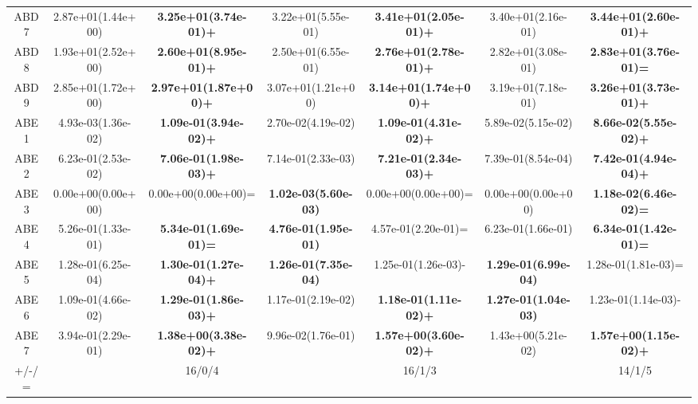 \begin{table}
\begin{tabular}{ccc|cc|cc}
  ABD7	&	2.87e+01(1.44e+00)	&	\textbf{3.25e+01(3.74e-01)+ }	&	3.22e+01(5.55e-01)	&	\textbf{3.41e+01(2.05e-01)+ }	&	3.40e+01(2.16e-01)	&	\textbf{3.44e+01(2.60e-01)+ }	\\
  ABD8	&	1.93e+01(2.52e+00)	&	\textbf{2.60e+01(8.95e-01)+ }	&	2.50e+01(6.55e-01)	&	\textbf{2.76e+01(2.78e-01)+ }	&	2.82e+01(3.08e-01)	&	\textbf{2.83e+01(3.76e-01)= }	\\
  ABD9	&	2.85e+01(1.72e+00)	&	\textbf{2.97e+01(1.87e+00)+ }	&	3.07e+01(1.21e+00)	&	\textbf{3.14e+01(1.74e+00)+ }	&	3.19e+01(7.18e-01)	&	\textbf{3.26e+01(3.73e-01)+ }	\\
  ABE1	&	4.93e-03(1.36e-02)	&	\textbf{1.09e-01(3.94e-02)+ }	&	2.70e-02(4.19e-02)	&	\textbf{1.09e-01(4.31e-02)+ }	&	5.89e-02(5.15e-02)	&	\textbf{8.66e-02(5.55e-02)+ }	\\
  ABE2	&	6.23e-01(2.53e-02)	&	\textbf{7.06e-01(1.98e-03)+ }	&	7.14e-01(2.33e-03)	&	\textbf{7.21e-01(2.34e-03)+ }	&	7.39e-01(8.54e-04)	&	\textbf{7.42e-01(4.94e-04)+ }	\\
  ABE3	&	0.00e+00(0.00e+00)	&	0.00e+00(0.00e+00)= 	&	\textbf{1.02e-03(5.60e-03)}	&	0.00e+00(0.00e+00)= 	&	0.00e+00(0.00e+00)	&	\textbf{1.18e-02(6.46e-02)= }	\\
  ABE4	&	5.26e-01(1.33e-01)	&	\textbf{5.34e-01(1.69e-01)= }	&	\textbf{4.76e-01(1.95e-01)}	&	4.57e-01(2.20e-01)= 	&	6.23e-01(1.66e-01)	&	\textbf{6.34e-01(1.42e-01)= }	\\
  ABE5	&	1.28e-01(6.25e-04)	&	\textbf{1.30e-01(1.27e-04)+ }	&	\textbf{1.26e-01(7.35e-04)}	&	1.25e-01(1.26e-03)- 	&	\textbf{1.29e-01(6.99e-04)}	&	1.28e-01(1.81e-03)= 	\\
  ABE6	&	1.09e-01(4.66e-02)	&	\textbf{1.29e-01(1.86e-03)+ }	&	1.17e-01(2.19e-02)	&	\textbf{1.18e-01(1.11e-02)+ }	&	\textbf{1.27e-01(1.04e-03)}	&	1.23e-01(1.14e-03)- 	\\
  ABE7	&	3.94e-01(2.29e-01)	&	\textbf{1.38e+00(3.38e-02)+ }	&	9.96e-02(1.76e-01)	&	\textbf{1.57e+00(3.60e-02)+ }	&	1.43e+00(5.21e-02)	&	\textbf{1.57e+00(1.15e-02)+ }	\\
  \midrule
  +/-/=	&		&	16/0/4	&		&	16/1/3	&		&	14/1/5	\\
  \bottomrule
  \end{tabular}
\end{table}

